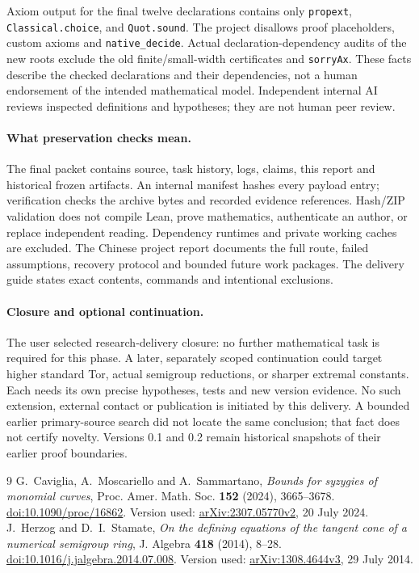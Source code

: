 \documentclass[11pt,a4paper]{article}
\begin{document}
{\raggedright
Axiom output for the final twelve declarations contains only
\texttt{propext}, \texttt{Classical.choice}, and \texttt{Quot.sound}.
The project disallows proof placeholders, custom axioms and
\texttt{native\_decide}. Actual declaration-dependency audits of the new roots
exclude the old finite/small-width certificates and \texttt{sorryAx}.
These facts describe the checked declarations and their dependencies, not a
human endorsement of the intended mathematical model. Independent internal
AI reviews inspected definitions and hypotheses; they are not human peer review.\par}

\paragraph{What preservation checks mean.}
The final packet contains source, task history, logs, claims, this report and
historical frozen artifacts. An internal manifest hashes every payload entry;
verification checks the archive bytes and recorded evidence references.
Hash/ZIP validation does not compile Lean, prove mathematics, authenticate
an author, or replace independent reading. Dependency runtimes and private
working caches are excluded. The Chinese project report documents the full
route, failed assumptions, recovery protocol and bounded future work packages.
The delivery guide states exact contents, commands and intentional exclusions.

\paragraph{Closure and optional continuation.}
The user selected research-delivery closure: no further mathematical task is
required for this phase. A later, separately scoped continuation could target
higher standard Tor, actual semigroup reductions, or sharper extremal constants.
Each needs its own precise hypotheses, tests and new version evidence.
No such extension, external contact or publication is initiated by this delivery.
A bounded earlier primary-source search did not locate the same conclusion;
that fact does not certify novelty. Versions 0.1 and 0.2 remain historical
snapshots of their earlier proof boundaries.

\begin{thebibliography}{9}
 G.~Caviglia, A.~Moscariello and A.~Sammartano,
\emph{Bounds for syzygies of monomial curves},
Proc. Amer. Math. Soc. \textbf{152} (2024), 3665--3678.
\href{https://doi.org/10.1090/proc/16862}{doi:10.1090/proc/16862}.
Version used: \href{https://arxiv.org/abs/2307.05770v2}{arXiv:2307.05770v2}, 20 July 2024.
 J.~Herzog and D.~I.~Stamate,
\emph{On the defining equations of the tangent cone of a numerical semigroup ring},
J. Algebra \textbf{418} (2014), 8--28.
\href{https://doi.org/10.1016/j.jalgebra.2014.07.008}{doi:10.1016/j.jalgebra.2014.07.008}.
Version used: \href{https://arxiv.org/abs/1308.4644v3}{arXiv:1308.4644v3}, 29 July 2014.
\end{thebibliography}
\end{document}
